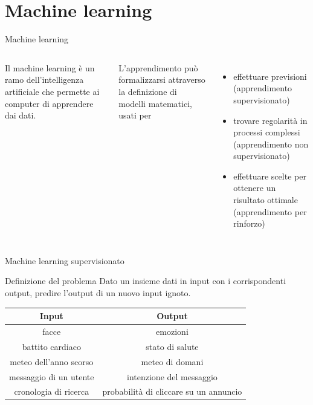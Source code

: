 \documentclass{beamer}
\begin{document}
    \section{Machine learning}

    \begin{frame}{Machine learning}
        \begin{columns}
            Il machine learning è un ramo dell'intelligenza artificiale che permette ai computer di apprendere dai dati. 

            L'apprendimento può formalizzarsi attraverso la definizione di modelli matematici, usati per
            \begin{itemize}
                \item effettuare previsioni (apprendimento supervisionato)
                \item trovare regolarità in processi complessi (apprendimento non supervisionato)
                \item effettuare scelte per ottenere un risultato ottimale (apprendimento per rinforzo)
            \end{itemize}
        \end{columns}
    \end{frame}

    \begin{frame}{Machine learning supervisionato}
        \begin{block}{Definizione del problema}
            Dato un insieme dati in input con i corrispondenti output, predire l'output di un nuovo input ignoto. 
        \end{block}
        \begin{tabular}{cc}
            Input & Output \\ \hline
            facce & emozioni \\ 
            battito cardiaco & stato di salute \\ 
            meteo dell'anno scorso & meteo di domani \\ 
            messaggio di un utente & intenzione del messaggio \\ 
            cronologia di ricerca & probabilità di cliccare su un annuncio
        \end{tabular}
    \end{frame}
\end{document}
